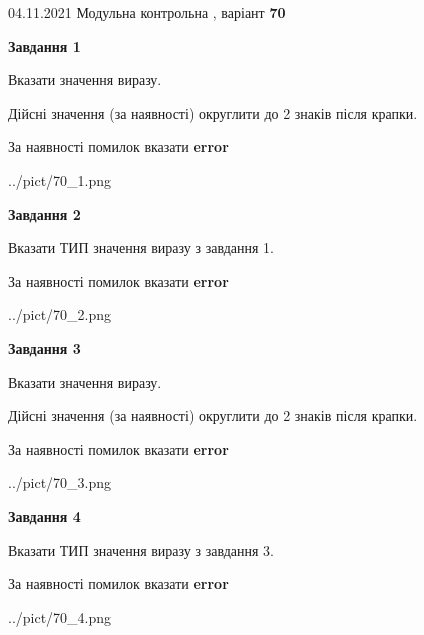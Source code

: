 \documentclass[11pt, ukrainian]{article}
\begin{document}
{04.11.2021 Модульна контрольна , варіант  \No \textbf { 70 }\par}
{
\begin {large}
{\begin {center}\textbf{Завдання 1}\end {center}}\par
Вказати значення виразу. \par
Дійсні значення (за наявності) округлити до 2 знаків після крапки. \par
За наявності помилок вказати \textbf{error}

\begin{center}
	{../pict/70_1.png}
\end{center}
\newpage

{\begin {center}\textbf{Завдання 2}\end {center}}\par
Вказати ТИП значення виразу з завдання 1. \par
За наявності помилок вказати \textbf{error}

\begin{center}
	{../pict/70_2.png}
\end{center}
\newpage

{\begin {center}\textbf{Завдання 3}\end {center}}\par
Вказати значення виразу. \par
Дійсні значення (за наявності) округлити до 2 знаків після крапки. \par
За наявності помилок вказати \textbf{error}

\begin{center}
	{../pict/70_3.png}
\end{center}
\newpage

{\begin {center}\textbf{Завдання 4}\end {center}}\par
Вказати ТИП значення виразу з завдання 3. \par
За наявності помилок вказати \textbf{error}

\begin{center}
	{../pict/70_4.png}
\end{center}
\newpage


\end{large}}
\end{document}
